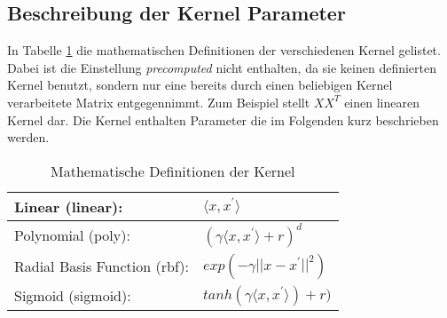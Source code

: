 \subsection{Beschreibung der Kernel Parameter}
In Tabelle \ref{tab:svm_kernel} die mathematischen Definitionen der verschiedenen Kernel gelistet. Dabei ist die Einstellung \emph{precomputed} nicht enthalten, da sie keinen definierten Kernel benutzt, sondern nur eine bereits durch einen beliebigen Kernel verarbeitete Matrix entgegennimmt. Zum Beispiel stellt $XX^{T}$ einen linearen Kernel dar. Die Kernel enthalten Parameter die im Folgenden kurz beschrieben werden.
\begin{table}[h]
	\centering
	\begin{tabular}{ll}
		\hline
		Linear (linear): &$\langle x,x^{'}\rangle$\\ \hline
		Polynomial (poly): &$(\gamma\langle x,x^{'}\rangle + r)^{d}$\\ \hline
		Radial Basis Function (rbf): &$exp(-\gamma ||x-x^{'}||^{2})$\\ \hline
		Sigmoid (sigmoid): &$tanh(\gamma \langle x,x^{'}\rangle) + r)$ \\\hline
		\hline
	\end{tabular}
	\caption{Mathematische Definitionen der Kernel}
	\label{tab:svm_kernel} 
\end{table}

